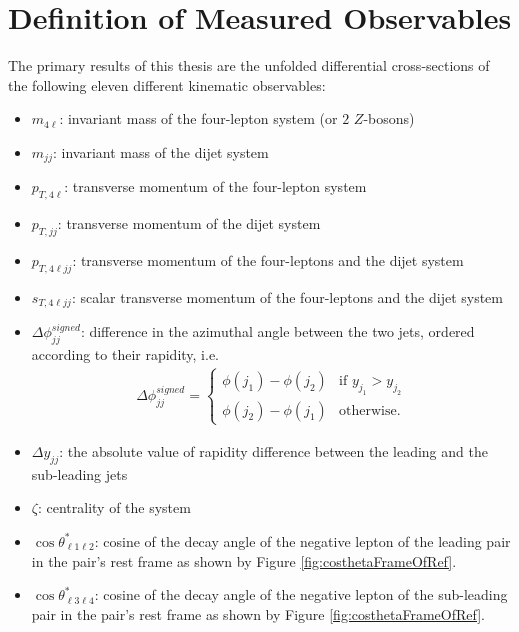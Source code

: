 \section{Definition of Measured Observables}
\label{sec:Obs}

The primary results of this thesis are the unfolded differential cross-sections of the following eleven different kinematic observables:

\begin{itemize}

\item{	$m_{4\ell}$: invariant mass of the four-lepton system (or $2$ $Z$-bosons)}
\item{ 	$m_{jj}$:  invariant mass of the dijet system}
\item{	$p_{T,4\ell}$: transverse momentum of the four-lepton system }
\item{	$p_{T, jj}$: transverse momentum of the dijet system}
\item{	$p_{T,4\ell jj}$: transverse momentum of the four-leptons and the dijet system}
\item{	$s_{T,4\ell jj}$: scalar transverse momentum of the four-leptons and the dijet system}
\item{ 	$\Delta \phi _{jj}^{signed}$: difference in the azimuthal angle between the two jets, ordered according to their rapidity, i.e. 
\begin{align*}
	\Delta \phi _{jj}^{signed} = 
	\begin{cases}
	\phi(j_1)-\phi(j_2) & \text{if $y_{j_1} > y_{j_2}$}\\
	\phi(j_2)-\phi(j_1) & \text{otherwise.}
	\end{cases} 
\end{align*}
}
\item{ $\Delta y_{jj}$: the absolute value of rapidity difference between the leading and the sub-leading jets}
\item{ $\zeta$: centrality of the system}
\item{ $\cos \theta^{*}_{\ell 1 \ell 2}$: cosine of the decay angle of the negative lepton of the leading pair in the pair's rest frame as shown by Figure \ref{fig:costhetaFrameOfRef}.}
\item{ $\cos \theta^{*}_{\ell 3 \ell 4}$: cosine of the decay angle of the negative lepton of the sub-leading pair in the pair's rest frame as shown by Figure \ref{fig:costhetaFrameOfRef}. }

\end{itemize}

